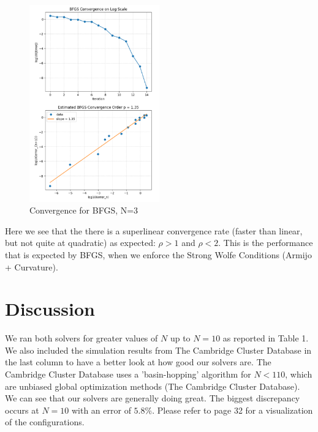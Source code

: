 \documentclass[11pt,onecolumn]{article}
\begin{document}
\begin{figure}[h]
  \centering
  \includegraphics[width=0.5\textwidth]{./BFGS_conv_random.png}
  \caption{Convergence for BFGS, N=3}
\end{figure}
\noindent 
Here we see that the there is a superlinear convergence rate (faster than linear, but not quite at quadratic) as expected: $\rho>1$ and $\rho<2$. This is the performance that is expected by BFGS, when we enforce the Strong Wolfe Conditions (Armijo + Curvature).
\newpage
\section{Discussion}
We ran both solvers for greater values of $N$ up to $N=10$ as reported in Table 1. We also included the simulation results from The Cambridge Cluster Database in the last column to have a better look at how good our solvers are. The Cambridge Cluster Database uses a 'basin-hopping' algorithm for $N<110$, which are unbiased global optimization methods (The Cambridge Cluster Database). We can see that our solvers are generally doing great. The biggest discrepancy occurs at $N=10$ with an error of $5.8\%$. Please refer to page 32 for a visualization of the configurations.
\end{document}
